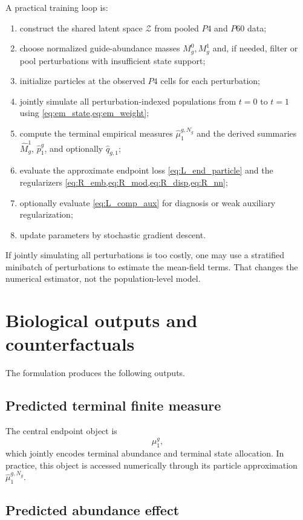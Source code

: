 \documentclass[11pt]{article}
\newcommand{\Zcal}{\mathcal{Z}}
\begin{document}
A practical training loop is:
\begin{enumerate}[label=(\arabic*),leftmargin=2.2em]
    \item construct the shared latent space $\Zcal$ from pooled $P4$ and $P60$ data;
    \item choose normalized guide-abundance masses $M_g^0,M_g^1$ and, if needed, filter or pool perturbations with insufficient state support;
    \item initialize particles at the observed $P4$ cells for each perturbation;
    \item jointly simulate all perturbation-indexed populations from $t=0$ to $t=1$ using \cref{eq:em_state,eq:em_weight};
    \item compute the terminal empirical measures $\hat\mu_1^{g,N_g}$ and the derived summaries $\hat M_g^1$, $\hat p_1^g$, and optionally $\hat q_{g,1}$;
    \item evaluate the approximate endpoint loss \cref{eq:L_end_particle} and the regularizers \cref{eq:R_emb,eq:R_mod,eq:R_disp,eq:R_nn};
    \item optionally evaluate \cref{eq:L_comp_aux} for diagnosis or weak auxiliary regularization;
    \item update parameters by stochastic gradient descent.
\end{enumerate}

If jointly simulating all perturbations is too costly, one may use a stratified minibatch of perturbations to estimate the mean-field terms. That changes the numerical estimator, not the population-level model.

\section{Biological outputs and counterfactuals}

The formulation produces the following outputs.

\subsection{Predicted terminal finite measure}

The central endpoint object is
\[
\mu_1^g,
\]
which jointly encodes terminal abundance and terminal state allocation. In practice, this object is accessed numerically through its particle approximation $\hat\mu_1^{g,N_g}$.

\subsection{Predicted abundance effect}
\end{document}
